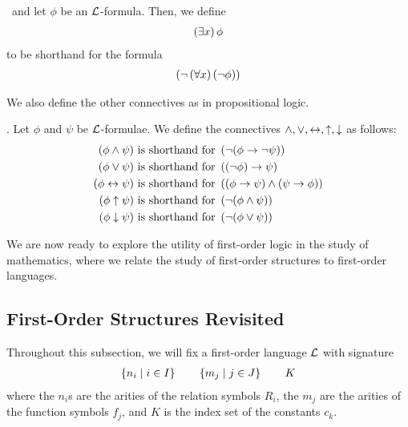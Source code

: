 \begin{boxdefinition}
    \Letla\ and let $\phi$ be an $\mathcal{L}$-formula. Then, we define
    \begin{align*}
        \left( \exists x \right) \phi
    \end{align*}
    to be shorthand for the formula
    \begin{align*}
        \left( \neg\left( \forall x \right)\left( \neg \phi \right) \right)
    \end{align*}
\end{boxdefinition}

We also define the other connectives as in propositional logic.

\begin{boxdefinition}[Connectives]
    \Letla. Let $\phi$ and $\psi$ be $\mathcal{L}$-formulae. We define the connectives $\land, \lor, \leftrightarrow, \uparrow, \downarrow$ as follows:
    \begin{align*}
        \left( \phi \land \psi \right) &\text{ is shorthand for } \left( \neg (\phi \to \neg \psi) \right) \\
        \left( \phi \lor \psi \right) &\text{ is shorthand for } \left( \left( \neg \phi \right) \to \psi \right) \\
        \left( \phi \leftrightarrow \psi \right) &\text{ is shorthand for } \left( (\phi \to \psi) \land (\psi \to \phi) \right) \\
        \left( \phi \uparrow \psi \right) &\text{ is shorthand for } \left( \neg (\phi \land \psi) \right) \\
        \left( \phi \downarrow \psi \right) &\text{ is shorthand for } \left( \neg (\phi \lor \psi) \right)
    \end{align*}
\end{boxdefinition}

We are now ready to explore the utility of first-order logic in the study of mathematics, where we relate the study of first-order structures to first-order languages.

\subsection{First-Order Structures Revisited}

Throughout this subsection, we will fix a first-order language $\mathcal{L}$ with signature
\begin{align*}
    \left\{ n_i \; \middle\vert \; i \in I \right\}
    \qquad
    \left\{ m_j \; \middle\vert \; j \in J \right\}
    \qquad
    K
\end{align*}
where the $n_i$s are the arities of the relation symbols $R_i$, the $m_j$ are the arities of the function symbols $f_j$, and $K$ is the index set of the constants $c_k$.

